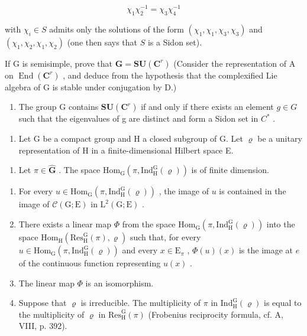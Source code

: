 \[
\chi_ {1} \chi_ {2} ^ {- 1} = \chi_ {3} \chi_ {4} ^ {- 1}
\]

with \(\chi_{i} \in S\) admits only the solutions of the form \((\chi_{1}, \chi_{1}, \chi_{3}, \chi_{3})\) and \((\chi_{1}, \chi_{2}, \chi_{1}, \chi_{2})\) (one then says that \(S\) is a Sidon set).

If G is semisimple, prove that \(\mathbf{G} = \mathbf{S}\mathbf{U}(\mathbf{C}^{r})\) (Consider the representation of A on \(\operatorname{End}(\mathbf{C}^{r})\) , and deduce from the hypothesis that the complexified Lie algebra of G is stable under conjugation by D.)

\begin{enumerate}
\def\labelenumi{\alph{enumi})}
\setcounter{enumi}{1}
\tightlist
\item
  The group G contains \(\mathbf{SU}(\mathbf{C}^{r})\) if and only if there exists an element \(g \in G\) such that the eigenvalues of g are distinct and form a Sidon set in \(C^{*}\) .
\end{enumerate}

\begin{enumerate}
\def\labelenumi{\arabic{enumi})}
\setcounter{enumi}{16}
\tightlist
\item
  Let G be a compact group and H a closed subgroup of G. Let \(\varrho\) be a unitary representation of H in a finite-dimensional Hilbert space E.
\end{enumerate}

\begin{enumerate}
\def\labelenumi{\alph{enumi})}
\tightlist
\item
  Let \(\pi \in \widehat{\mathbf{G}}\) . The space \(\mathrm{Hom}_{\mathrm{G}}(\pi, \mathrm{Ind}_{\mathrm{H}}^{\mathrm{G}}(\varrho))\) is of finite dimension.

\end{enumerate}

\begin{enumerate}
\def\labelenumi{\alph{enumi})}
\setcounter{enumi}{1}
\item
  For every \(u \in \mathrm{Hom}_{\mathrm{G}}(\pi, \mathrm{Ind}_{\mathrm{H}}^{\mathrm{G}}(\varrho))\) , the image of \(u\) is contained in the image of \(\mathcal{C}(\mathrm{G};\mathrm{E})\) in \(\mathrm{L}^2 (\mathrm{G};\mathrm{E})\) .
\item
  There exists a linear map \(\Phi\) from the space \(\mathrm{Hom}_{\mathrm{G}}(\pi, \mathrm{Ind}_{\mathrm{H}}^{\mathrm{G}}(\varrho))\) into the space \(\mathrm{Hom}_{\mathrm{H}}(\mathrm{Res}_{\mathrm{H}}^{\mathrm{G}}(\pi), \varrho)\) such that, for every \(u \in \mathrm{Hom}_{\mathrm{G}}(\pi, \mathrm{Ind}_{\mathrm{H}}^{\mathrm{G}}(\varrho))\) and every \(x \in \mathrm{E}_{\pi}\) , \(\Phi(u)(x)\) is the image at \(e\) of the continuous function representing \(u(x)\) .
\item
  The linear map \(\Phi\) is an isomorphism.
\item
  Suppose that \(\varrho\) is irreducible. The multiplicity of \(\pi\) in \(\mathrm{Ind}_{\mathrm{H}}^{\mathrm{G}}(\varrho)\) is equal to the multiplicity of \(\varrho\) in \(\mathrm{Res}_{\mathrm{H}}^{\mathrm{G}}(\pi)\) (Frobenius reciprocity formula, cf. A, VIII, p. 392).
\end{enumerate}

